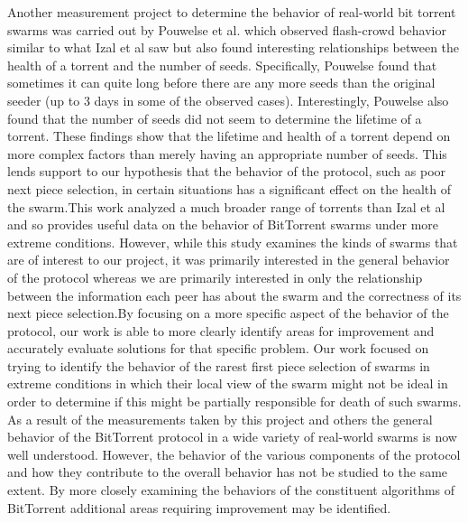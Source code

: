 Another measurement project \cite{pouwelse} to determine the behavior of real-world
bit torrent swarms was carried out by Pouwelse et al. which observed
flash-crowd behavior similar to what Izal et al saw but also found
interesting relationships between the health of a torrent and the number
of seeds. Specifically, Pouwelse found that sometimes it can quite long
before there are any more seeds than the original seeder (up to 3 days
in some of the observed cases). Interestingly, Pouwelse also found
that the number of seeds did not seem to determine the lifetime of a
torrent. These findings show that the lifetime and health of a torrent
depend on more complex factors than merely having an appropriate number
of seeds. This lends support to our hypothesis that the behavior of the
protocol, such as poor next piece selection, in certain situations has a
significant effect on the health of the swarm.This work analyzed a much
broader range of torrents than Izal et al and so provides useful data on
the behavior of BitTorrent swarms under more extreme conditions. However,
while this study examines the kinds of swarms that are of interest to
our project, it was primarily interested in the general behavior of the
protocol whereas we are primarily interested in only the relationship
between the information each peer has about the swarm and the correctness
of its next piece selection.By focusing on a more specific aspect of
the behavior of the protocol, our work is able to more clearly identify
areas for improvement and accurately evaluate solutions for that specific
problem. Our work focused on trying to identify the behavior of the
rarest first piece selection of swarms in extreme conditions in which
their local view of the swarm might not be ideal in order to determine
if this might be partially responsible for death of such swarms. As a
result of the measurements taken by this project and others the general
behavior of the BitTorrent protocol in a wide variety of real-world swarms
is now well understood. However, the behavior of the various components
of the protocol and how they contribute to the overall behavior has not
be studied to the same extent. By more closely examining the behaviors
of the constituent algorithms of BitTorrent additional areas requiring
improvement may be identified.

